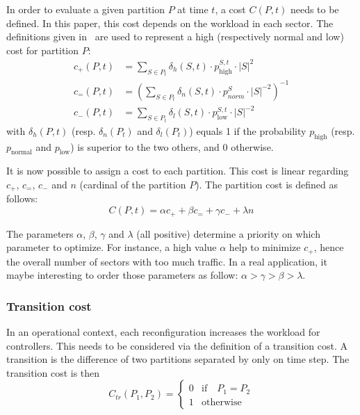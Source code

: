 \documentclass[oneside,twocolumn]{article}
\begin{document}
In order to evaluate a given partition $P$ at time $t$, a cost $C(P, t)$ needs
to be defined. In this paper, this cost depends on the workload in each
sector. The definitions given in~\cite{ferrari2017} are used to represent a high
(respectively normal and low) cost for partition \(P\):
\begin{equation}
  \begin{aligned}
    c_+(P, t) &= \sum_{S \in P_t} \delta_{h}(S, t) \cdot p_\text{high}^{S, t} \cdot |S|^2\\
    c_=(P, t) &= \left(
    \sum_{S \in P_t} \delta_{n}(S, t) \cdot p_{norm}^{S} \cdot |S|^{-2}
    \right)^{-1}\\
    c_-(P, t) &= \sum_{S \in P_t} \delta_{l}(S, t) \cdot p_\text{low}^{S, t} \cdot |S|^{-2}
  \end{aligned}
\end{equation}
with $\delta_{h}(P, t)$ (resp. $\delta_{n}(P_t)$ and $\delta_{l}(P_t)$) equals 1
if the probability $p_\text{high}$ (resp. $p_\text{normal}$ and $p_\text{low}$) is superior to
the two others, and 0 otherwise.

It is now possible to assign a cost to each partition. This cost is linear
regarding $c_+$, $c_=$, $c_-$ and $n$ (cardinal of the partition $P$). The
partition cost is defined as follows:
\begin{equation}
  C(P, t) = \alpha c_+ + \beta c_= + \gamma c_- +\lambda n
\end{equation}

The parameters $\alpha$, $\beta$, $\gamma$ and $\lambda$ (all positive)
determine a priority on which parameter to optimize. For instance, a high
value $\alpha$ help to
minimize $c_+$, hence the overall number of sectors with too much traffic.
In a real application, it maybe interesting to order those parameters as
follow: $\alpha > \gamma > \beta > \lambda$.

\subsubsection{Transition cost}

In an operational context, each reconfiguration increases the workload for
controllers. This needs to be considered via the definition of a transition
cost.
A transition is the difference of two partitions separated by only on time step.
The transition cost is then
\begin{equation}
  C_{tr}(P_1, P_2) =
  \begin{cases}
    0 & \text{if} \quad P_1 = P_2\\
    1 & \text{otherwise}
  \end{cases}
\end{equation}
\end{document}
